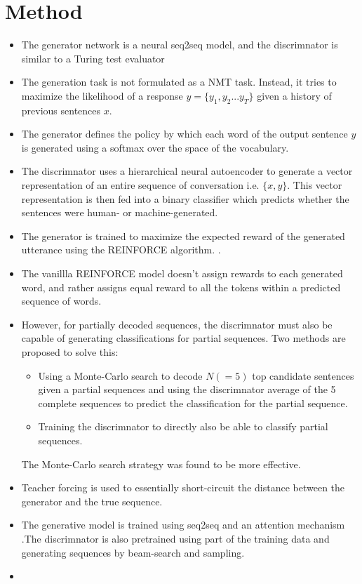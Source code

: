 \documentclass[12pt]{scrartcl}
\begin{document}
\section{Method}
  \begin{itemize}
    \item The generator network is a neural seq2seq model, and the discrimnator is similar to a Turing test evaluator
    \item The generation task is not formulated as a NMT task. Instead, it tries to maximize the likelihood of a response $y = \{y_1, y_2 ... y_T\}$ given a history of previous sentences $x$.
    \item The generator defines the policy by which each word of the output sentence $y$ is generated using a softmax over the space of the vocabulary.
    \item The discrimnator uses a hierarchical neural autoencoder \cite{li2015hierarchical} to generate a vector representation of an entire sequence of conversation i.e. $\{x, y\}$. This vector representation is then fed into a binary classifier which predicts whether the sentences were human- or machine-generated.
    \item The generator is trained to maximize the expected reward of the generated utterance using the REINFORCE algorithm. \cite{williams1992simple}.
    \item The vanillla REINFORCE model doesn't assign rewards to each generated word, and rather assigns equal reward to all the tokens within a predicted sequence of words.
    \item However, for partially decoded sequences, the discrimnator must also be capable of generating classifications for partial sequences. Two methods are proposed to solve this:
      \begin{itemize}
        \item Using a Monte-Carlo search to decode $N ( = 5)$ top candidate sentences given a partial sequences and using the discrimnator average of the 5 complete sequences to predict the classification for the partial sequence.
        \item Training the discrimnator to directly also be able to classify partial sequences.
      \end{itemize}
    The Monte-Carlo search strategy was found to be more effective.
    \item Teacher forcing is used to essentially short-circuit the distance between the generator and the true sequence.
    \item The generative model is trained using seq2seq \cite{sutskever2014sequence} and an attention mechanism \cite{bahdanau2014neural}.The discrimnator is also pretrained using part of the training data and generating sequences by beam-search and sampling.
    \item 
  \end{itemize}
\end{document}
